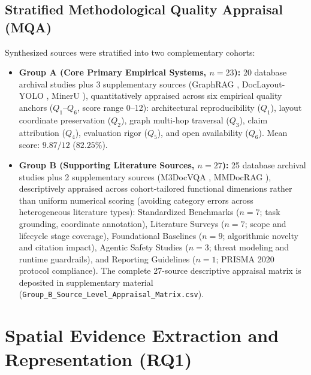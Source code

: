 \documentclass[conference,a4paper]{IEEEtran}
\begin{document}
\subsection{Stratified Methodological Quality Appraisal (MQA)}
Synthesized sources were stratified into two complementary cohorts:
\begin{itemize}
    \item \textbf{Group A (Core Primary Empirical Systems, $n=23$):} 20 database archival studies plus 3 supplementary sources (GraphRAG \cite{edge2024}, DocLayout-YOLO \cite{zhao2024doclayout}, MinerU \cite{wang2024mineru}), quantitatively appraised across six empirical quality anchors ($Q_1$--$Q_6$, score range 0--12): architectural reproducibility ($Q_1$), layout coordinate preservation ($Q_2$), graph multi-hop traversal ($Q_3$), claim attribution ($Q_4$), evaluation rigor ($Q_5$), and open availability ($Q_6$). Mean score: $9.87/12$ ($82.25\%$).
    \item \textbf{Group B (Supporting Literature Sources, $n=27$):} 25 database archival studies plus 2 supplementary sources (M3DocVQA \cite{m3docvqa2025}, MMDocRAG \cite{dong2025mmdocrag}), descriptively appraised across cohort-tailored functional dimensions rather than uniform numerical scoring (avoiding category errors across heterogeneous literature types): Standardized Benchmarks ($n=7$; task grounding, coordinate annotation), Literature Surveys ($n=7$; scope and lifecycle stage coverage), Foundational Baselines ($n=9$; algorithmic novelty and citation impact), Agentic Safety Studies ($n=3$; threat modeling and runtime guardrails), and Reporting Guidelines ($n=1$; PRISMA 2020 protocol compliance). The complete 27-source descriptive appraisal matrix is deposited in supplementary material (\texttt{Group\_B\_Source\_Level\_Appraisal\_Matrix.csv}).
\end{itemize}

\section{Spatial Evidence Extraction and Representation (RQ1)}
\end{document}
